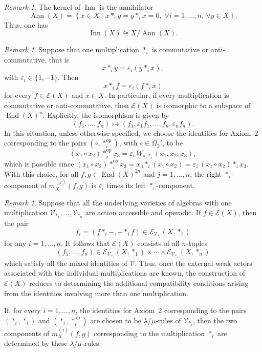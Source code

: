 \documentclass[reqno,a4paper]{amsart}
\theoremstyle{plain}
\theoremstyle{definition}
\theoremstyle{remark}
\newtheorem{remark}[subsection]{Remark}
\numberwithin{equation}{section}
\newcommand{\E}{\mathcal{E}}
\newcommand{\V}{\mathcal{V}}
\DeclareMathOperator{\op}{op}
\DeclareMathOperator{\End}{End}
\DeclareMathOperator{\Inn}{Inn}
\DeclareMathOperator{\Ann}{Ann}
\begin{document}
\begin{remark}
The kernel of $\operatorname{Inn}$ is the annihilator
\[
\Ann(X)
=
\left\{
x\in X
\mid
x\ast_i y=y\ast_i x=0, \; \forall i=1,\ldots,n, \, \forall y\in X
\right\}.
\]
Thus, one has
\[
\Inn(X)\cong X/\Ann(X).
\]
\end{remark}

\begin{remark}\label{RemarkCommutativeOperationTwo}
Suppose that one multiplication $\ast_i$ is commutative or anti-commutative, that is
\[
x\ast_i y=\varepsilon_i(y\ast_i x),
\]
with $\varepsilon_i\in\{1,-1\}$. Then
\[
x\ast_i f=\varepsilon_i(f\ast_i x)
\]
for every $f\in\E(X)$ and $x\in X$. In particular, if every multiplication is commutative or anti-commutative, then $\E(X)$ is isomorphic to a subspace of $\End(X)^n$. Explicitly, the isomorphism is given by
\[
(f_1,\ldots,f_n)
\longmapsto
(f_1,\varepsilon_1f_1,\ldots,f_n,\varepsilon_nf_n).
\]
In this situation, unless otherwise specified, we choose the identities for Axiom~2 corresponding to the pairs $(\circ,\ast_i^{\op})$, with $\circ\in\Omega_2'$, to be
\[
(x_1\circ x_2)\ast_i^{\op}x_3=\varepsilon_i\,W_{\circ,\ast_i}(x_1,x_2;x_3),
\]
which is possible since $(x_1\circ x_2)\ast_i^{\op}x_3=x_3\ast_i(x_1\circ x_2)=\varepsilon_i\,(x_1\circ x_2)\ast_ix_3$. With this choice, for all $f,g\in\End(X)^{2n}$ and $j=1,\ldots,n$, the right $\ast_i$-component of $m_X^{(j)}(f,g)$ is $\varepsilon_i$ times its left $\ast_i$-component.
\end{remark}

\begin{remark}\label{RemarkOneOperationCase}
Suppose that all the underlying varieties of algebras with one multiplication $\V_{\ast_1}, \ldots, \V_{\ast_n}$ are action accessible and operadic. If $f\in\E(X)$, then the pair
\[
f_i=(f\ast_i-,-\ast_i f)\in\E_{\V_{\ast_i}}(X,\ast_i)
\]
for any $i=1,\ldots,n$. It follows that $\E(X)$ consists of all $n$-tuples
\[
(f_1,\ldots,f_n)
\in
\E_{\V_{\ast_1}}(X,\ast_1)\times \cdots \times \E_{\V_{\ast_n}}(X,\ast_n)
\]
which satisfy all the mixed identities of $\V$. Thus, once the external weak actors associated with the individual multiplications are known, the construction of $\E(X)$ reduces to determining the additional compatibility conditions arising from the identities involving more than one multiplication.

If, for every $i=1,\ldots,n$, the identities for Axiom~2 corresponding to the pairs $(\ast_i,\ast_i)$ and $(\ast_i,\ast_i^{\op})$ are chosen to be $\lambda/\mu$-rules of $\V_{\ast_i}$, then the two components of $m_X^{(i)}(f,g)$ corresponding to the multiplication $\ast_i$ are determined by these $\lambda/\mu$-rules.
\end{remark}
\end{document}
